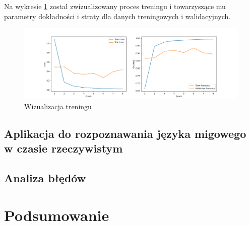 \documentclass[a4paper,12pt,oneside]{book} %
\begin{document}
Na wykresie \ref{model_train} został zwizualizowany proces treningu i towarzyszące mu parametry dokładności i straty dla danych treningowych i walidacyjnych.

\begin{figure}[h]
	\centering
	\includegraphics[scale=0.31]{train.png}
	\caption{Wizualizacja treningu}
	\label{model_train}
\end{figure}

\section{Aplikacja do rozpoznawania języka migowego w czasie rzeczywistym}
\lipsum[1]

\section{Analiza błędów}
\lipsum[1]

\chapter{Podsumowanie}
\lipsum[1]
\lipsum[1]

\listoftables{} %

\listoffigures{} %

\lstlistoflistings
{}



\end{document}
